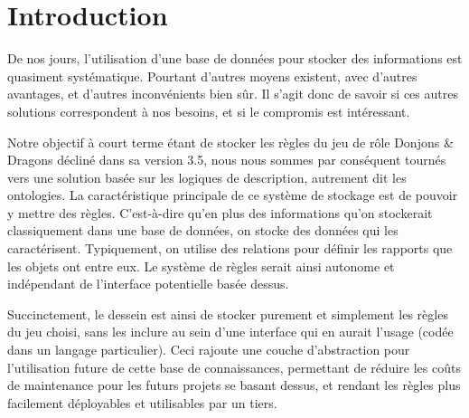 

\section{Introduction}

\par De nos jours, l'utilisation d'une base de données pour stocker des informations est quasiment systématique. Pourtant d'autres moyens existent, avec d'autres avantages, et d'autres inconvénients bien sûr. Il s'agit donc de savoir si ces autres solutions correspondent à nos besoins, et si le compromis est intéressant.
\par Notre objectif à court terme étant de stocker les règles du jeu de rôle Donjons \& Dragons décliné dans sa version 3.5, nous nous sommes par conséquent tournés vers une solution basée sur les logiques de description, autrement dit les ontologies. La caractéristique principale de ce système de stockage est de pouvoir y mettre des règles. C'est-à-dire qu'en plus des informations qu'on stockerait classiquement dans une base de données, on stocke des données qui les caractérisent. Typiquement, on utilise des relations pour définir les rapports que les objets ont entre eux. Le système de règles serait ainsi autonome et indépendant de l'interface potentielle basée dessus.
\par Succinctement, le dessein est ainsi de stocker purement et simplement les règles du jeu choisi, sans les inclure au sein d'une interface qui en aurait l'usage (codée dans un langage particulier). Ceci rajoute une couche d'abstraction pour l'utilisation future de cette base de connaissances, permettant de réduire les coûts de maintenance pour les futurs projets se basant dessus, et rendant les règles plus facilement déployables et utilisables par un tiers.